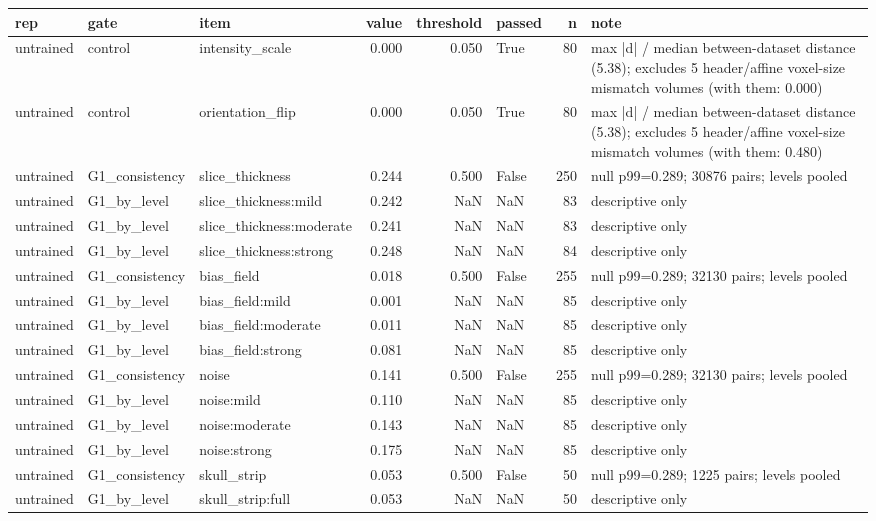 \begin{tabular}{lllrrlrl}
\toprule
rep & gate & item & value & threshold & passed & n & note \\
\midrule
untrained & control & intensity\_scale & 0.000 & 0.050 & True & 80 & max |d| / median between-dataset distance (5.38); excludes 5 header/affine voxel-size mismatch volumes (with them: 0.000) \\
untrained & control & orientation\_flip & 0.000 & 0.050 & True & 80 & max |d| / median between-dataset distance (5.38); excludes 5 header/affine voxel-size mismatch volumes (with them: 0.480) \\
untrained & G1\_consistency & slice\_thickness & 0.244 & 0.500 & False & 250 & null p99=0.289; 30876 pairs; levels pooled \\
untrained & G1\_by\_level & slice\_thickness:mild & 0.242 & NaN & NaN & 83 & descriptive only \\
untrained & G1\_by\_level & slice\_thickness:moderate & 0.241 & NaN & NaN & 83 & descriptive only \\
untrained & G1\_by\_level & slice\_thickness:strong & 0.248 & NaN & NaN & 84 & descriptive only \\
untrained & G1\_consistency & bias\_field & 0.018 & 0.500 & False & 255 & null p99=0.289; 32130 pairs; levels pooled \\
untrained & G1\_by\_level & bias\_field:mild & 0.001 & NaN & NaN & 85 & descriptive only \\
untrained & G1\_by\_level & bias\_field:moderate & 0.011 & NaN & NaN & 85 & descriptive only \\
untrained & G1\_by\_level & bias\_field:strong & 0.081 & NaN & NaN & 85 & descriptive only \\
untrained & G1\_consistency & noise & 0.141 & 0.500 & False & 255 & null p99=0.289; 32130 pairs; levels pooled \\
untrained & G1\_by\_level & noise:mild & 0.110 & NaN & NaN & 85 & descriptive only \\
untrained & G1\_by\_level & noise:moderate & 0.143 & NaN & NaN & 85 & descriptive only \\
untrained & G1\_by\_level & noise:strong & 0.175 & NaN & NaN & 85 & descriptive only \\
untrained & G1\_consistency & skull\_strip & 0.053 & 0.500 & False & 50 & null p99=0.289; 1225 pairs; levels pooled \\
untrained & G1\_by\_level & skull\_strip:full & 0.053 & NaN & NaN & 50 & descriptive only \\

\end{tabular}
